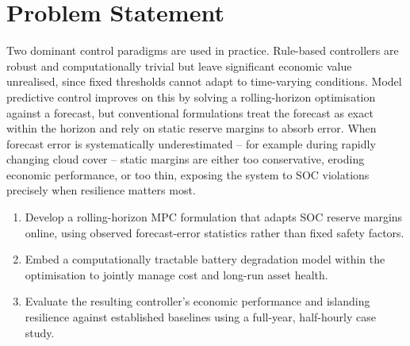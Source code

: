 \section{Problem Statement}

Two dominant control paradigms are used in practice. Rule-based controllers are robust and computationally trivial but leave significant economic value unrealised, since fixed thresholds cannot adapt to time-varying conditions. Model predictive control improves on this by solving a rolling-horizon optimisation against a forecast, but conventional formulations treat the forecast as exact within the horizon and rely on static reserve margins to absorb error. When forecast error is systematically underestimated -- for example during rapidly changing cloud cover -- static margins are either too conservative, eroding economic performance, or too thin, exposing the system to SOC violations precisely when resilience matters most.

\begin{tcolorbox}[infobox={Research Objectives}]
\begin{enumerate}[label=\textbf{O\arabic*.}, leftmargin=2.2em]
  \item Develop a rolling-horizon MPC formulation that adapts SOC reserve margins online, using observed forecast-error statistics rather than fixed safety factors.
  \item Embed a computationally tractable battery degradation model within the optimisation to jointly manage cost and long-run asset health.
  \item Evaluate the resulting controller's economic performance and islanding resilience against established baselines using a full-year, half-hourly case study.
\end{enumerate}
\end{tcolorbox}
